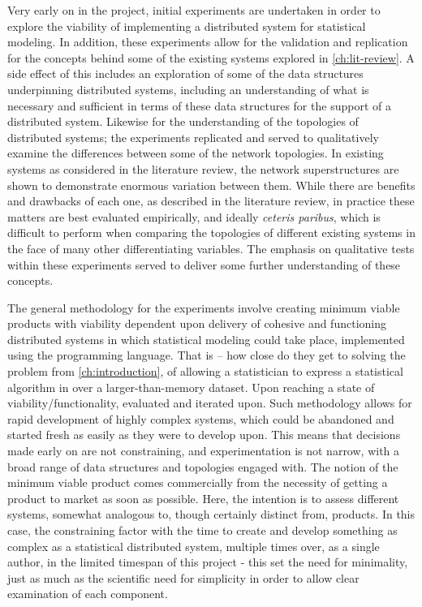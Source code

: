 Very early on in the \lsr{} project, initial experiments are undertaken in order to explore the viability of implementing a distributed system for statistical modeling.
In addition, these experiments allow for the validation and replication for the concepts behind some of the existing systems explored in \cref{ch:lit-review}.
A side effect of this includes an exploration of some of the data structures underpinning distributed systems, including an understanding of what is necessary and sufficient in terms of these data structures for the support of a distributed system.
Likewise for the understanding of the topologies of distributed systems; the experiments replicated and served to qualitatively examine the differences between some of the network topologies.
In existing systems as considered in the literature review, the network superstructures are shown to demonstrate enormous variation between them.
While there are benefits and drawbacks of each one, as described in the literature review, in practice these matters are best evaluated empirically, and ideally \textit{ceteris paribus}, which is difficult to perform when comparing the topologies of different existing systems in the face of many other differentiating variables.
The emphasis on qualitative tests within these experiments served to deliver some further understanding of these concepts.

The general methodology for the experiments involve creating minimum viable products with viability dependent upon delivery of cohesive and functioning distributed systems in which statistical modeling could take place, implemented using the \R{} programming language.
That is -- how close do they get to solving the problem from \cref{ch:introduction}, of allowing a statistician to express a statistical algorithm in \R{} over a larger-than-memory dataset.
Upon reaching a state of viability/functionality, evaluated and iterated upon.
Such methodology allows for rapid development of highly complex systems, which could be abandoned and started fresh as easily as they were to develop upon.
This means that decisions made early on are not constraining, and experimentation is not narrow, with a broad range of data structures and topologies engaged with.
The notion of the minimum viable product comes commercially from the necessity of getting a product to market as soon as possible.
Here, the intention is to assess different systems, somewhat analogous to, though certainly distinct from, products.
In this case, the constraining factor with the time to create and develop something as complex as a statistical distributed system, multiple times over, as a single author, in the limited timespan of this project - this set the need for minimality, just as much as the scientific need for simplicity in order to allow clear examination of each component.

